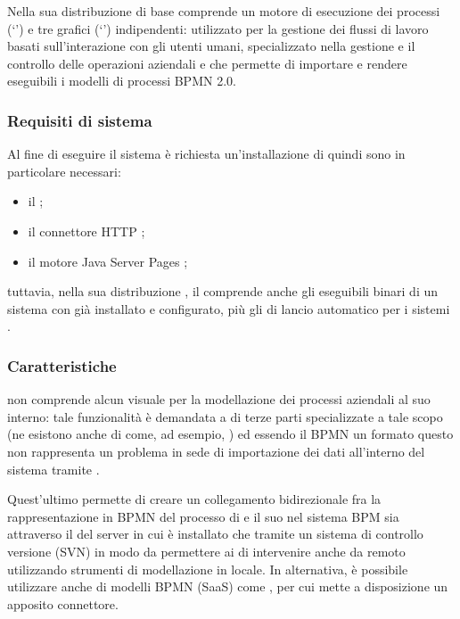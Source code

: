 Nella sua distribuzione di base comprende un motore di esecuzione dei processi (`') e tre  grafici (`') indipendenti:  utilizzato per la gestione dei flussi di lavoro basati sull'interazione con gli utenti umani,  specializzato nella gestione e il controllo delle operazioni aziendali e  che permette di importare e rendere eseguibili i modelli di processi BPMN 2.0.

\subsubsection{Requisiti di sistema}
Al fine di eseguire il sistema è richiesta un'installazione di  quindi sono in particolare necessari:
\begin{itemize}
  \item il  ;
  \item il connettore HTTP ;
  \item il motore Java Server Pages ;
\end{itemize}
tuttavia, nella sua distribuzione , il \sw comprende anche gli eseguibili binari di un sistema  con \progname già installato e configurato, più gli  di lancio automatico per i sistemi .

\subsubsection{Caratteristiche}
\progname non comprende alcun  visuale per la modellazione dei processi aziendali al suo interno: tale funzionalità è demandata a \sw di terze parti specializzate a tale scopo (ne esistono anche di  come, ad esempio, ) ed essendo il BPMN un formato  questo non rappresenta un problema in sede di importazione dei dati all'interno del sistema tramite .

Quest'ultimo permette di creare un collegamento bidirezionale fra la rappresentazione in BPMN del processo di \bsn e il suo  nel sistema BPM sia attraverso il  del server in cui è installato \progname che tramite un sistema di controllo versione (SVN) in modo da permettere ai \bsn {} di intervenire anche da remoto utilizzando strumenti di modellazione in locale. In alternativa, è possibile utilizzare anche  di modelli BPMN  (SaaS) come , per cui \progname mette a disposizione un apposito connettore.

